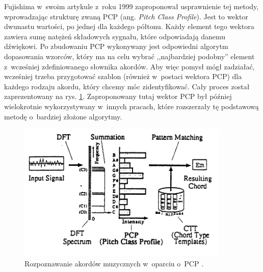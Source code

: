 Fujishima \cite{fujishima_realtime_1999} w~swoim artykule z~roku 1999 zaproponował usprawnienie tej metody, wprowadzając strukturę zwaną PCP (ang. \emph{Pitch Class Profile}). Jest to wektor dwunastu wartości, po jednej dla każdego półtonu. Każdy element tego wektora zawiera sumę natężeń składowych sygnału, które odpowiadają danemu dźwiękowi. Po zbudowaniu PCP wykonywany jest odpowiedni algorytm dopasowania wzorców, który ma na celu wybrać ,,najbardziej podobny'' element z~wcześniej zdefiniowanego słownika akordów. Aby więc pomysł mógł zadziałać, wcześniej trzeba przygotować szablon (również w~postaci wektora PCP) dla każdego rodzaju akordu, który chcemy móc zidentyfikować. Cały proces został zaprezentowany na rys. \ref{fig:rozpoznawanie_stare_2}. Zaproponowany tutaj wektor PCP był później wielokrotnie wykorzystywany w~innych pracach, które rozszerzały tę podstawową metodę o~bardziej złożone algorytmy.

\begin{figure}[htb]
    \centering
    \includegraphics[width=0.9\textwidth]{images/rozpoznawanie_stare_2}
    \caption{Rozpoznawanie akordów muzycznych w~oparciu o~PCP \cite{fujishima_realtime_1999}.}
    \label{fig:rozpoznawanie_stare_2}
\end{figure}
